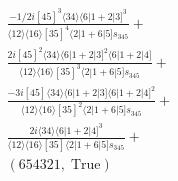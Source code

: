\documentclass[varwidth, border=5pt]{standalone}
\begin{document}
\begin{my}
$\begin{gathered}
\scriptscriptstyle\frac{-1/2i[45]^3⟨34⟩⟨6|1+2|3]^3}{⟨12⟩⟨16⟩[35]^4⟨2|1+6|5]s_{345}}+\\
\scriptscriptstyle\frac{2i[45]^2⟨34⟩⟨6|1+2|3]^2⟨6|1+2|4]}{⟨12⟩⟨16⟩[35]^3⟨2|1+6|5]s_{345}}+\\
\scriptscriptstyle\frac{-3i[45]⟨34⟩⟨6|1+2|3]⟨6|1+2|4]^2}{⟨12⟩⟨16⟩[35]^2⟨2|1+6|5]s_{345}}+\\
\scriptscriptstyle\frac{2i⟨34⟩⟨6|1+2|4]^3}{⟨12⟩⟨16⟩[35]⟨2|1+6|5]s_{345}}+\\
\scriptscriptstyle(654321,\;\text{True})\phantom{+}
\end{gathered}$
\end{my}
\end{document}
